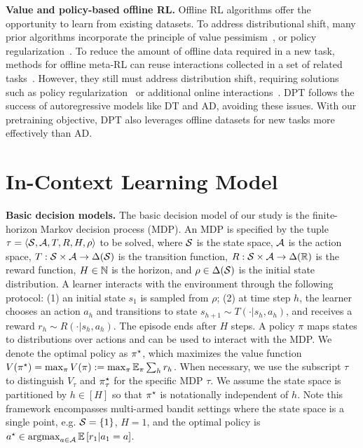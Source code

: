 \documentclass{article}
\begin{document}
\textbf{Value and policy-based offline RL.}
Offline RL algorithms offer the opportunity to learn from existing datasets.  
To address distributional shift, many prior algorithms incorporate the principle of value pessimism~\citep{kumar2020conservative,yu2021combo,liu2020provably,ghasemipour2022so}, or policy regularization~\citep{fujimoto2019off,kumar2019stabilizing,wu2019behavior,siegel2020keep,liu2019off}. 
To reduce the amount of offline data required in a new task, methods for offline meta-RL can reuse interactions collected in a set of related tasks~\citep{li2020focal,mitchell2021offline,dorfman2021offline}. However, they still must address distribution shift,  requiring solutions such as policy regularization~\citep{li2020focal} or additional online interactions~\citep{pong2022offline}.  
DPT follows the success of autoregressive models like DT and AD, avoiding these issues. With our pretraining objective, DPT also leverages offline datasets for new tasks more effectively than AD.

\section{In-Context Learning Model}
\label{sec:in-context}





\textbf{Basic decision models.} The basic decision model of our study is the finite-horizon Markov decision process (MDP). An MDP is specified by the tuple $\tau = \langle {\mathcal{S}}, \mathcal{A}, T, R, H, \rho \rangle$ to be solved, where ${\mathcal{S}}$ is the state space, $\mathcal{A}$ is the action space, $T: {\mathcal{S}} \times \mathcal{A} \to \Delta({\mathcal{S}})$ is the transition function, $R: {\mathcal{S}} \times \mathcal{A} \to \Delta(\mathbb{R})$ is the reward function, $H \in \mathbb{N}$ is the horizon, and $\rho \in \Delta({\mathcal{S}})$ is the initial state distribution. A learner interacts with the environment through the following protocol: (1) an initial state $s_1$ is sampled from $\rho$; (2) at time step $h$, the learner chooses an action $a_h$ and transitions to state $s_{h+1} \sim T(\cdot|s_h,a_h)$, and receives a reward $r_h \sim R(\cdot | s_h, a_h)$. The episode ends after $H$ steps. A policy $\pi$ maps states to distributions over actions and can be used to interact with the MDP. We denote the optimal policy as $\pi^{\star}$, which maximizes the value function $V(\pi^{\star}) = \max_{\pi} V(\pi) :=  \max_{\pi} \mathbb{E}_{\pi} \sum_h r_h$. When necessary, we use the subscript $\tau$ to distinguish $V_\tau$ and $\pi^{\star}_\tau$ for the specific MDP $\tau$. We assume the state space is partitioned by $h \in [H]$ so that $\pi^{\star}$ is notationally independent of $h$. Note this framework encompasses multi-armed bandit settings where the state space is a single point, e.g. ${\mathcal{S}} = \{1\}$, $H=1$, and the optimal policy is  $a^\star \in \mathop{\mathrm{argmax}}_{a \in \mathcal{A}} \mathbb{E} \left[r_1| a_1 = a\right]$.
\end{document}
